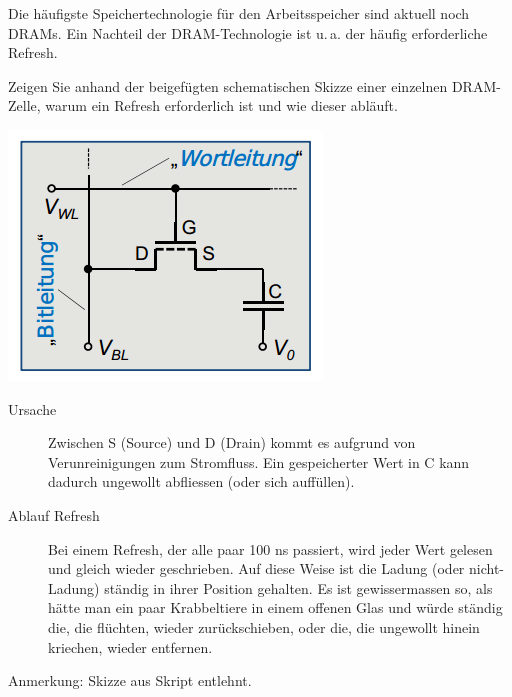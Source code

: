 \pagebreak
\question
Die häufigste Speichertechnologie
für den Arbeitsspeicher
sind aktuell noch DRAMs. Ein Nachteil der DRAM-Technologie ist u.\,a. der häufig erforderliche Refresh.

Zeigen Sie anhand der beigefügten schematischen Skizze einer einzelnen DRAM-Zelle, warum ein Refresh erforderlich ist und wie dieser abläuft.
\begin{solutionordottedlines}[2cm]
\begin{center}
	\includegraphics[width=\linewidth]{Refresh_Reason.png}
\end{center}
\begin{description}
	\item [Ursache]
	Zwischen S (Source) und D (Drain) kommt es aufgrund von Verunreinigungen zum Stromfluss.
	Ein gespeicherter Wert in C kann dadurch ungewollt abfliessen (oder sich auffüllen).
	\item[Ablauf Refresh]
	Bei einem Refresh, der alle paar 100 ns passiert, wird jeder Wert gelesen und gleich wieder geschrieben. Auf diese Weise ist die Ladung (oder nicht-Ladung) ständig in ihrer Position gehalten. Es ist gewissermassen so, als hätte man ein paar Krabbeltiere in einem offenen Glas und würde ständig die, die flüchten, wieder zurückschieben, oder die, die ungewollt hinein kriechen, wieder entfernen. 
\end{description}
Anmerkung: Skizze aus Skript entlehnt.
\end{solutionordottedlines}
